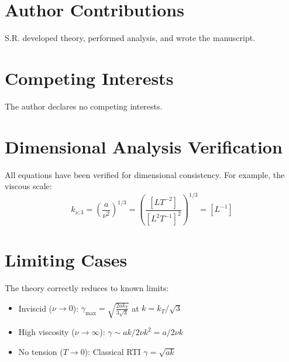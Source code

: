 \documentclass[aps,pre,twocolumn,showpacs,superscriptaddress]{revtex4-2}
\theoremstyle{definition}
\begin{document}
\section*{Author Contributions}
S.R. developed theory, performed analysis, and wrote the manuscript.

\section*{Competing Interests}
The author declares no competing interests.

\appendix

\section{Dimensional Analysis Verification}

All equations have been verified for dimensional consistency. For example, the viscous scale:
\[
k_{\nu,3} = \left(\frac{a}{\nu^2}\right)^{1/3} = \left(\frac{[LT^{-2}]}{[L^2T^{-1}]^2}\right)^{1/3} = [L^{-1}]
\]

\section{Limiting Cases}

The theory correctly reduces to known limits:
\begin{itemize}
\item Inviscid ($\nu \to 0$): $\gamma_{\max} = \sqrt{\frac{2ak_T}{3\sqrt{3}}}$ at $k = k_T/\sqrt{3}$
\item High viscosity ($\nu \to \infty$): $\gamma \sim ak/2\nu k^2 = a/2\nu k$
\item No tension ($T \to 0$): Classical RTI $\gamma = \sqrt{ak}$
\end{itemize}


\end{document}

